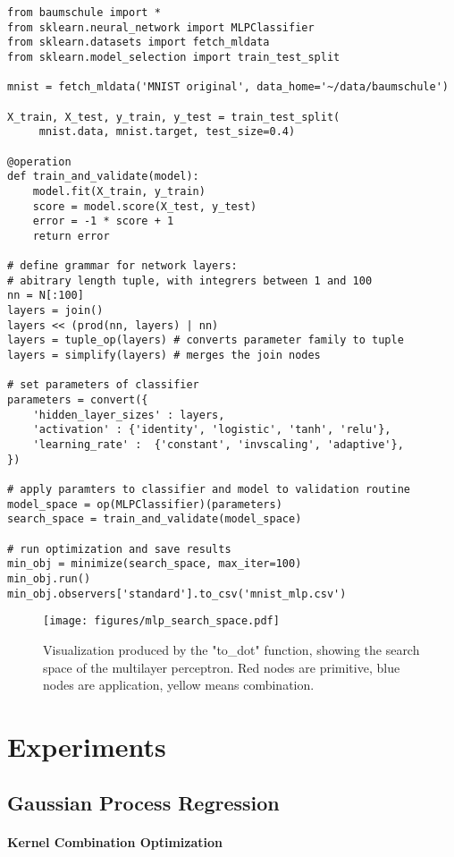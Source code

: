 \documentclass[english]{article}
\begin{document}
\begin{verbatim}
from baumschule import *
from sklearn.neural_network import MLPClassifier
from sklearn.datasets import fetch_mldata
from sklearn.model_selection import train_test_split

mnist = fetch_mldata('MNIST original', data_home='~/data/baumschule')

X_train, X_test, y_train, y_test = train_test_split(
     mnist.data, mnist.target, test_size=0.4)

@operation
def train_and_validate(model):
    model.fit(X_train, y_train)
    score = model.score(X_test, y_test)
    error = -1 * score + 1
    return error

# define grammar for network layers:
# abitrary length tuple, with integrers between 1 and 100
nn = N[:100]
layers = join()
layers << (prod(nn, layers) | nn)
layers = tuple_op(layers) # converts parameter family to tuple
layers = simplify(layers) # merges the join nodes

# set parameters of classifier
parameters = convert({
    'hidden_layer_sizes' : layers,
    'activation' : {'identity', 'logistic', 'tanh', 'relu'},
    'learning_rate' :  {'constant', 'invscaling', 'adaptive'},
})

# apply paramters to classifier and model to validation routine
model_space = op(MLPClassifier)(parameters)
search_space = train_and_validate(model_space)

# run optimization and save results
min_obj = minimize(search_space, max_iter=100)
min_obj.run()
min_obj.observers['standard'].to_csv('mnist_mlp.csv')

\end{verbatim}

\begin{figure}
  \texttt{[image: figures/mlp\_search\_space.pdf]}
  \caption{Visualization produced by the "to\_dot" function, showing the search space of the multilayer perceptron. Red nodes are primitive, blue nodes are application, yellow means combination.}
  \label{mlp_search_space}
\end{figure}


\section{Experiments}
\subsection{Gaussian Process Regression}
\paragraph{Kernel Combination Optimization}
\end{document}
